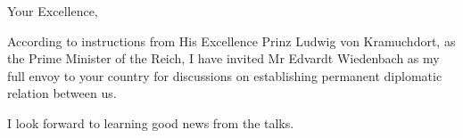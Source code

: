 

\renewcommand{\letterheadgovbody}{Nummer 8}




\noindent
Your Excellence,

According to instructions from His Excellence Prinz Ludwig von Kramuchdort,
as the Prime Minister of the Reich,
I have invited Mr Edvardt Wiedenbach as my full envoy to your country
for discussions on establishing permanent diplomatic relation between us.

I look forward to learning good news from the talks.


